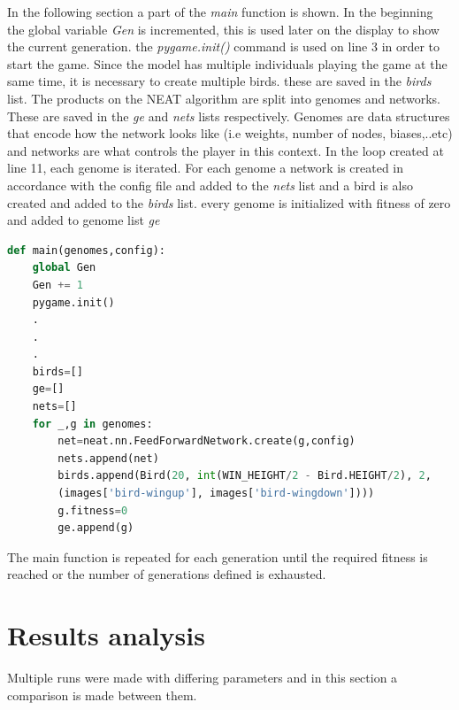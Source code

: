 \documentclass[conference]{IEEEtran}
\begin{document}
In the following section a part of the \textit{main} function is shown. In the beginning the global variable \textit{Gen} is incremented, this is used later on the display to show the current generation. the \textit{pygame.init()} command is used on line 3 in order to start the game. Since the model has multiple individuals playing the game at the same time, it is necessary to create multiple birds. these are saved in the \textit{birds} list. The products on the NEAT algorithm are split into genomes and networks. These are saved in the \textit{ge} and \textit{nets} lists respectively. Genomes are data structures that encode how the network looks like (i.e weights, number of nodes, biases,..etc) and networks are what controls the player in this context. In the loop created at line 11, each genome is iterated. For each genome a network is created in accordance with the config file and added to the \textit{nets} list and a bird is also created and added to the \textit{birds} list. every genome is initialized with fitness of zero and added to genome list \textit{ge}
\begin{lstlisting}[language=Python, caption=main function]
def main(genomes,config):
	global Gen
	Gen += 1
	pygame.init()
	.
	.
	.
	birds=[]
	ge=[]
	nets=[]
	for _,g in genomes:
		net=neat.nn.FeedForwardNetwork.create(g,config)
		nets.append(net)
		birds.append(Bird(20, int(WIN_HEIGHT/2 - Bird.HEIGHT/2), 2,
		(images['bird-wingup'], images['bird-wingdown'])))
		g.fitness=0
		ge.append(g)\end{lstlisting}
The main function is repeated for each generation until the required fitness is reached or the number of generations defined is exhausted.
\section{Results analysis}
Multiple runs were made with differing parameters and in this section a comparison is made between them. 
\end{document}
